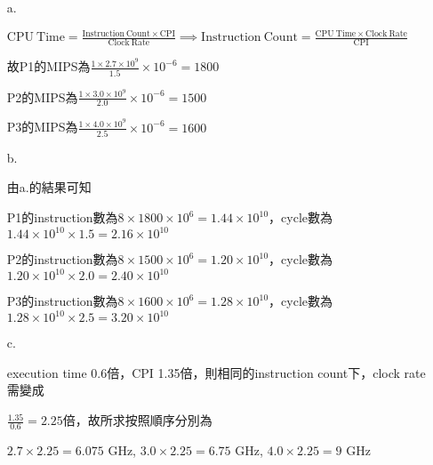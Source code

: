 \documentclass{article}
\begin{document}
\section{}

\begin{enumerate}
    \item[a.]

        \(\displaystyle
        \mathrm{CPU\ Time} = \frac{\mathrm{Instruction\ Count} \times \mathrm{CPI}}{\mathrm{Clock\ Rate}}
        \implies \mathrm{Instruction\ Count} = \frac{\mathrm{CPU\ Time} \times \mathrm{Clock\ Rate}}{\mathrm{CPI}}
        \)

        故P1的MIPS為\(\displaystyle\frac{1 \times 2.7 \times 10 ^ 9}{1.5} \times 10 ^ {-6} = 1800\)

        P2的MIPS為\(\displaystyle\frac{1 \times 3.0 \times 10 ^ 9}{2.0} \times 10 ^ {-6} = 1500\)

        P3的MIPS為\(\displaystyle\frac{1 \times 4.0 \times 10 ^ 9}{2.5} \times 10 ^ {-6} = 1600\)

    \item[b.]

        由a.的結果可知

        P1的instruction數為\(8 \times 1800 \times 10^6 = 1.44 \times 10^{10}\)，cycle數為\(1.44 \times 10^{10} \times 1.5 = 2.16 \times 10^{10}\)

        P2的instruction數為\(8 \times 1500 \times 10^6 = 1.20 \times 10^{10}\)，cycle數為\(1.20 \times 10^{10} \times 2.0 = 2.40 \times 10^{10}\)

        P3的instruction數為\(8 \times 1600 \times 10^6 = 1.28 \times 10^{10}\)，cycle數為\(1.28 \times 10^{10} \times 2.5 = 3.20 \times 10^{10}\)

    \item[c.]

        execution time 0.6倍，CPI 1.35倍，則相同的instruction count下，clock rate需變成

        \(\displaystyle\frac{1.35}{0.6}=2.25\)倍，故所求按照順序分別為

        \(2.7 \times 2.25 = 6.075\) GHz, \(3.0 \times 2.25 = 6.75\) GHz, \(4.0 \times 2.25 = 9\) GHz
\end{enumerate}

\section{}
\end{document}
